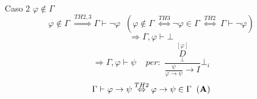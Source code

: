\documentclass{article}
\theoremstyle{break}
\theoremstyle{break}
\theoremstyle{break}
\theoremstyle{break}
\begin{document}
\begin{itemize}
\begin{enumerate}
\begin{enumerate}
          \item [Caso 2] \( \varphi \notin \Gamma \) 
            \[
              \varphi \notin \Gamma \; \stackrel{TH2,3}{\Rightarrow} \Gamma \vdash \neg \varphi\;\; (\varphi \notin \Gamma\; \stackrel{TH3}{\Leftrightarrow} \neg \varphi \in \Gamma\; \stackrel{TH2}{\Leftrightarrow}\; \Gamma \vdash \neg \varphi)
            \]
            \[
              \Rightarrow \Gamma, \varphi \vdash \bot
            \] 
            \[
              \Rightarrow \Gamma, \varphi \vdash \psi\;\;\;\;per:\; \frac{\underset{\bot}{\stackrel{[\varphi]}{D}}}{\frac{\psi}{\varphi \to \psi}\to I}\bot_i
            \] 
            \[
              \Gamma \vdash \varphi \to \psi \stackrel{TH2}{\Leftrightarrow} \varphi \to \psi \in \Gamma\;\;(\text{\textbf{A}})
            \] 
        \end{enumerate}
    \end{enumerate}
\end{itemize}
\end{document}
